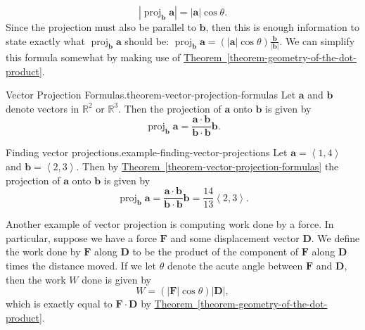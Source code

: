 \documentclass[10pt,]{book}
\numberwithin{equation}{section}
\newcommand{\RR}{\mathbb{R}}
\newcommand{\vv}[1]{\mathbf{#1}}
\newcommand{\dotprod}[1]{\left\langle #1 \right\rangle}
\newcommand{\proj}[2]{\operatorname{proj}_{#1} #2}
\begin{document}
%
\begin{equation*}
|\proj{\vv{b}}{\vv{a}}| = |\vv{a}|\cos\theta.
\end{equation*}
\hypertarget{p-1156}{}%
Since the projection must also be parallel to \(\vv{b}\), then this is enough information to state exactly what \(\proj{\vv{b}}{\vv{a}}\) should be: \(\proj{\vv{b}}{\vv{a}} = (|\vv{a}|\cos\theta)\frac{\vv{b}}{|\vv{b}|}.\) We can simplify this formula somewhat by making use of \hyperref[theorem-geometry-of-the-dot-product]{Theorem~\ref{theorem-geometry-of-the-dot-product}}.%
\begin{theorem}{Vector Projection Formulas.}{}{theorem-vector-projection-formulas}%
\hypertarget{p-1157}{}%
Let \(\vv{a}\) and \(\vv{b}\) denote vectors in \(\RR^{2}\) or \(\RR^{3}\). Then the projection of \(\vv{a}\) onto \(\vv{b}\) is given by%
%
\begin{equation*}
\proj{\vv{b}}{\vv{a}} = \frac{\vv{a}\cdot\vv{b}}{\vv{b}\cdot\vv{b}}\vv{b}.
\end{equation*}
\end{theorem}
\begin{example}{Finding vector projections.}{example-finding-vector-projections}%
\hypertarget{p-1158}{}%
Let \(\vv{a} = \dotprod{1,4}\) and \(\vv{b} = \dotprod{2,3}\). Then by \hyperref[theorem-vector-projection-formulas]{Theorem~\ref{theorem-vector-projection-formulas}} the projection of \(\vv{a}\) onto \(\vv{b}\) is given by%
%
\begin{equation*}
\proj{\vv{b}}{\vv{a}} = \frac{\vv{a}\cdot\vv{b}}{\vv{b}\cdot\vv{b}}\vv{b} = \frac{14}{13}\dotprod{2,3}.
\end{equation*}
\end{example}
\hypertarget{p-1159}{}%
Another example of vector projection is computing work done by a force. In particular, suppose we have a force \(\vv{F}\) and some displacement vector \(\vv{D}\). We define the work done by \(\vv{F}\) along \(\vv{D}\) to be the product of the component of \(\vv{F}\) along \(\vv{D}\) times the distance moved. If we let \(\theta\) denote the acute angle between \(\vv{F}\) and \(\vv{D}\), then the work \(W\) done is given by%
%
\begin{equation*}
W = (|\vv{F}|\cos\theta)|\vv{D}|,
\end{equation*}
\hypertarget{p-1160}{}%
which is exactly equal to \(\vv{F}\cdot\vv{D}\) by \hyperref[theorem-geometry-of-the-dot-product]{Theorem~\ref{theorem-geometry-of-the-dot-product}}.%
\end{document}
